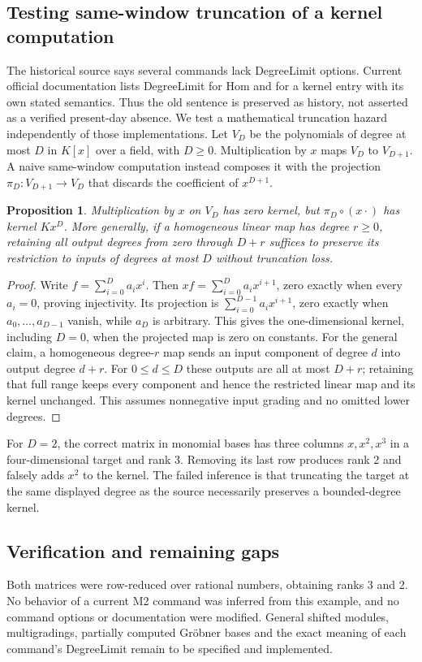 \documentclass[11pt]{article}
\newtheorem{proposition}{Proposition}
\begin{document}
\subsection{Testing same-window truncation of a kernel computation}
The historical source says several commands lack DegreeLimit options. Current official documentation lists DegreeLimit for Hom and for a kernel entry with its own stated semantics. Thus the old sentence is preserved as history, not asserted as a verified present-day absence. We test a mathematical truncation hazard independently of those implementations.
Let $V_D$ be the polynomials of degree at most $D$ in $K[x]$ over a field, with $D\ge0$. Multiplication by $x$ maps $V_D$ to $V_{D+1}$. A naive same-window computation instead composes it with the projection $\pi_D:V_{D+1}\to V_D$ that discards the coefficient of $x^{D+1}$.
\begin{proposition}
Multiplication by $x$ on $V_D$ has zero kernel, but $\pi_D\circ(x\cdot)$ has kernel $Kx^D$. More generally, if a homogeneous linear map has degree $r\ge0$, retaining all output degrees from zero through $D+r$ suffices to preserve its restriction to inputs of degrees at most $D$ without truncation loss.
\end{proposition}
\begin{proof}
Write $f=\sum_{i=0}^D a_ix^i$. Then $xf=\sum_{i=0}^D a_ix^{i+1}$, zero exactly when every $a_i=0$, proving injectivity. Its projection is $\sum_{i=0}^{D-1}a_ix^{i+1}$, zero exactly when $a_0,\ldots,a_{D-1}$ vanish, while $a_D$ is arbitrary. This gives the one-dimensional kernel, including $D=0$, when the projected map is zero on constants. For the general claim, a homogeneous degree-$r$ map sends an input component of degree $d$ into output degree $d+r$. For $0\le d\le D$ these outputs are all at most $D+r$; retaining that full range keeps every component and hence the restricted linear map and its kernel unchanged. This assumes nonnegative input grading and no omitted lower degrees.
\end{proof}
For $D=2$, the correct matrix in monomial bases has three columns $x,x^2,x^3$ in a four-dimensional target and rank 3. Removing its last row produces rank 2 and falsely adds $x^2$ to the kernel. The failed inference is that truncating the target at the same displayed degree as the source necessarily preserves a bounded-degree kernel.
\subsection{Verification and remaining gaps}
Both matrices were row-reduced over rational numbers, obtaining ranks 3 and 2. No behavior of a current M2 command was inferred from this example, and no command options or documentation were modified. General shifted modules, multigradings, partially computed Gröbner bases and the exact meaning of each command's DegreeLimit remain to be specified and implemented.
\end{document}
